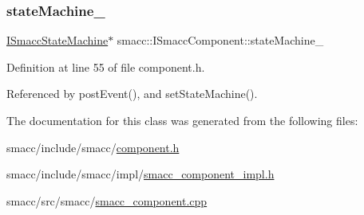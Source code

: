 \subsubsection{\texorpdfstring{state\+Machine\+\_\+}{stateMachine\_}}
{\footnotesize\ttfamily \hyperlink{classsmacc_1_1ISmaccStateMachine}{I\+Smacc\+State\+Machine}$\ast$ smacc\+::\+I\+Smacc\+Component\+::state\+Machine\+\_\+\hspace{0.3cm}{\ttfamily [protected]}}



Definition at line 55 of file component.\+h.



Referenced by post\+Event(), and set\+State\+Machine().



The documentation for this class was generated from the following files\+:\begin{DoxyCompactItemize}
\item 
smacc/include/smacc/\hyperlink{component_8h}{component.\+h}\item 
smacc/include/smacc/impl/\hyperlink{smacc__component__impl_8h}{smacc\+\_\+component\+\_\+impl.\+h}\item 
smacc/src/smacc/\hyperlink{smacc__component_8cpp}{smacc\+\_\+component.\+cpp}\end{DoxyCompactItemize}
